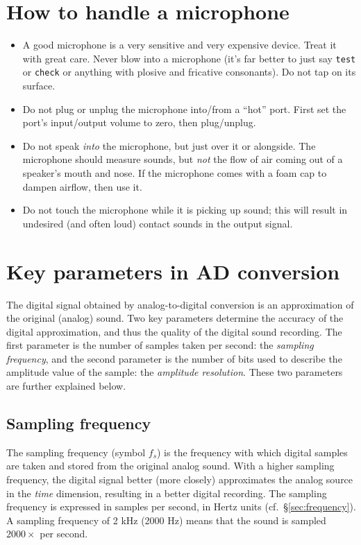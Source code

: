\documentclass[
]{book}
\begin{document}
\label{mic-howto}
\section{How to handle a microphone}\label{sec:microphone}

\begin{itemize}
\item
  A good microphone is a very sensitive and very expensive device. Treat it with great care. Never blow into a microphone (it's far better to just say \texttt{test} or \texttt{check} or anything with plosive and fricative consonants). Do not tap on its surface.
\item
  Do not plug or unplug the microphone into/from a ``hot'' port. First set the port's input/output volume to zero, then plug/unplug.
\item
  Do not speak \emph{into} the microphone, but just over it or alongside. The microphone should measure sounds, but \emph{not} the flow of air coming out of a speaker's mouth and nose. If the microphone comes with a foam cap to dampen airflow, then use it.
\item
  Do not touch the microphone while it is picking up sound; this will result in undesired (and often loud) contact sounds in the output signal.
\end{itemize}

\section{Key parameters in AD conversion}\label{key-parameters-in-ad-conversion}

The digital signal obtained by analog-to-digital conversion is an approximation of the original (analog) sound. Two key parameters determine the accuracy of the digital approximation, and thus the quality of the digital sound recording. The first parameter is the number of samples taken per second: the \emph{sampling frequency}, and the second parameter is the number of bits used to describe the amplitude value of the sample: the \emph{amplitude resolution}. These two parameters are further explained below.

\subsection{Sampling frequency}\label{sec:samplingfrequency}

The sampling frequency (symbol \(f_s\)) is the frequency with which digital samples are taken and stored from the original analog sound. With a higher sampling frequency, the digital signal better (more closely) approximates the analog source in the \emph{time} dimension, resulting in a better digital recording. The sampling frequency is expressed in samples per second, in Hertz units (cf.~§\ref{sec:frequency}). A sampling frequency of 2 kHz (2000 Hz) means that the sound is sampled \(2000 \times\) per second.
\end{document}
